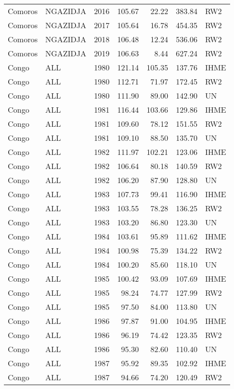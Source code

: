 \begin{longtable}{lllrrrl}
  Comoros & NGAZIDJA & 2016 & 105.67 & 22.22 & 383.84 & RW2 \\ 
  Comoros & NGAZIDJA & 2017 & 105.64 & 16.78 & 454.35 & RW2 \\ 
  Comoros & NGAZIDJA & 2018 & 106.48 & 12.24 & 536.06 & RW2 \\ 
  Comoros & NGAZIDJA & 2019 & 106.63 & 8.44 & 627.24 & RW2 \\ 
  Congo & ALL & 1980 & 121.14 & 105.35 & 137.76 & IHME \\ 
  Congo & ALL & 1980 & 112.71 & 71.97 & 172.45 & RW2 \\ 
  Congo & ALL & 1980 & 111.90 & 89.00 & 142.90 & UN \\ 
  Congo & ALL & 1981 & 116.44 & 103.66 & 129.86 & IHME \\ 
  Congo & ALL & 1981 & 109.60 & 78.12 & 151.55 & RW2 \\ 
  Congo & ALL & 1981 & 109.10 & 88.50 & 135.70 & UN \\ 
  Congo & ALL & 1982 & 111.97 & 102.21 & 123.06 & IHME \\ 
  Congo & ALL & 1982 & 106.64 & 80.18 & 140.59 & RW2 \\ 
  Congo & ALL & 1982 & 106.20 & 87.90 & 128.80 & UN \\ 
  Congo & ALL & 1983 & 107.73 & 99.41 & 116.90 & IHME \\ 
  Congo & ALL & 1983 & 103.55 & 78.28 & 136.25 & RW2 \\ 
  Congo & ALL & 1983 & 103.20 & 86.80 & 123.30 & UN \\ 
  Congo & ALL & 1984 & 103.61 & 95.89 & 111.62 & IHME \\ 
  Congo & ALL & 1984 & 100.98 & 75.39 & 134.22 & RW2 \\ 
  Congo & ALL & 1984 & 100.20 & 85.60 & 118.10 & UN \\ 
  Congo & ALL & 1985 & 100.42 & 93.09 & 107.69 & IHME \\ 
  Congo & ALL & 1985 & 98.24 & 74.77 & 127.99 & RW2 \\ 
  Congo & ALL & 1985 & 97.50 & 84.00 & 113.80 & UN \\ 
  Congo & ALL & 1986 & 97.87 & 91.00 & 104.95 & IHME \\ 
  Congo & ALL & 1986 & 96.19 & 74.42 & 123.35 & RW2 \\ 
  Congo & ALL & 1986 & 95.30 & 82.60 & 110.40 & UN \\ 
  Congo & ALL & 1987 & 95.92 & 89.35 & 102.92 & IHME \\ 
  Congo & ALL & 1987 & 94.66 & 74.20 & 120.49 & RW2 \\ 

\end{longtable}
